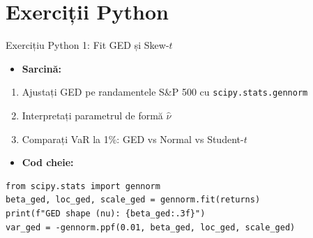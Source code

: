 \documentclass[9pt, aspectratio=169, t]{beamer}
\begin{document}
\section{Exerciții Python}

\begin{frame}[fragile]{Exercițiu Python 1: Fit GED și Skew-$t$}
    \begin{itemize}\setlength{\itemsep}{0pt}
        \item \textbf{Sarcină:}
    \end{itemize}
    \begin{enumerate}\setlength{\itemsep}{0pt}
        \item Ajustați GED pe randamentele S\&P 500 cu \texttt{scipy.stats.gennorm}
        \item Interpretați parametrul de formă $\hat{\nu}$
        \item Comparați VaR la 1\%: GED vs Normal vs Student-$t$
    \end{enumerate}

    \vspace{0.3cm}
    \begin{itemize}\setlength{\itemsep}{0pt}
        \item \textbf{Cod cheie:}
    \end{itemize}
    \begin{verbatim}
from scipy.stats import gennorm
beta_ged, loc_ged, scale_ged = gennorm.fit(returns)
print(f"GED shape (nu): {beta_ged:.3f}")
var_ged = -gennorm.ppf(0.01, beta_ged, loc_ged, scale_ged)
    \end{verbatim}

\end{frame}
\end{document}

